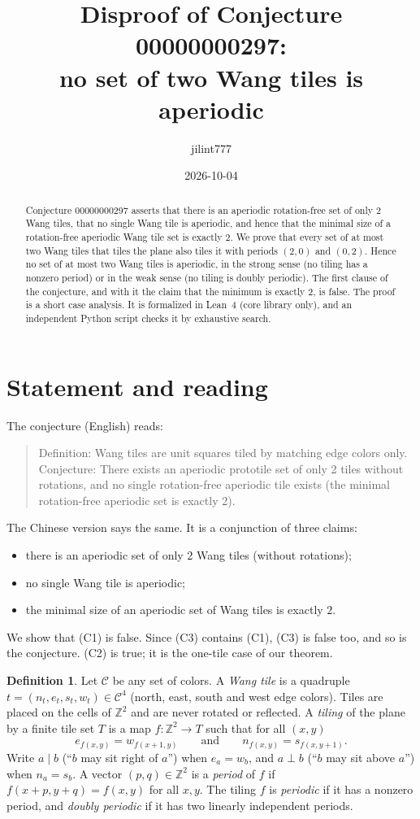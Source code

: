 \documentclass[11pt]{article}
\title{Disproof of Conjecture 00000000297:\\
no set of two Wang tiles is aperiodic}
\author{jilint777}
\date{2026-10-04}
\theoremstyle{definition}
\newtheorem{definition}[theorem]{Definition}
\theoremstyle{remark}
\begin{document}
\sloppy
\maketitle

\begin{abstract}
Conjecture 00000000297 asserts that there is an aperiodic rotation-free set of
only $2$ Wang tiles, that no single Wang tile is aperiodic, and hence that the
minimal size of a rotation-free aperiodic Wang tile set is exactly $2$. We prove
that every set of at most two Wang tiles that tiles the plane also tiles it with
periods $(2,0)$ and $(0,2)$. Hence no set of at most two Wang tiles is
aperiodic, in the strong sense (no tiling has a nonzero period) or in the weak
sense (no tiling is doubly periodic). The first clause of the conjecture, and
with it the claim that the minimum is exactly $2$, is false. The proof is a
short case analysis. It is formalized in Lean~4 (core library only), and an
independent Python script checks it by exhaustive search.
\end{abstract}

\section{Statement and reading}
The conjecture (English) reads:
\begin{quote}
Definition: Wang tiles are unit squares tiled by matching edge colors only.
Conjecture: There exists an aperiodic prototile set of only 2 tiles without
rotations, and no single rotation-free aperiodic tile exists (the minimal
rotation-free aperiodic set is exactly 2).
\end{quote}
The Chinese version says the same. It is a conjunction of three claims:
\begin{itemize}
\item[(C1)] there is an aperiodic set of only $2$ Wang tiles (without rotations);
\item[(C2)] no single Wang tile is aperiodic;
\item[(C3)] the minimal size of an aperiodic set of Wang tiles is exactly $2$.
\end{itemize}
We show that (C1) is false. Since (C3) contains (C1), (C3) is false too, and so
is the conjecture. (C2) is true; it is the one-tile case of our theorem.

\begin{definition}
Let $\mathcal C$ be any set of colors. A \emph{Wang tile} is a quadruple
$t=(n_t,e_t,s_t,w_t)\in\mathcal C^4$ (north, east, south and west edge colors).
Tiles are placed on the cells of $\mathbb Z^2$ and are never rotated or
reflected. A \emph{tiling} of the plane by a finite tile set $T$ is a map
$f:\mathbb Z^2\to T$ such that for all $(x,y)$
\[
 e_{f(x,y)}=w_{f(x+1,y)}\qquad\text{and}\qquad n_{f(x,y)}=s_{f(x,y+1)} .
\]
Write $a\mathrel{|}b$ (``$b$ may sit right of $a$'') when $e_a=w_b$, and
$a\mathrel{\bot}b$ (``$b$ may sit above $a$'') when $n_a=s_b$. A vector
$(p,q)\in\mathbb Z^2$ is a \emph{period} of $f$ if $f(x+p,y+q)=f(x,y)$ for all
$x,y$. The tiling $f$ is \emph{periodic} if it has a nonzero period, and
\emph{doubly periodic} if it has two linearly independent periods.
\end{definition}
\end{document}
